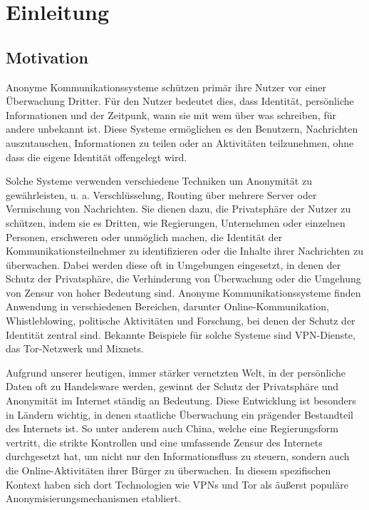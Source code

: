 \section{Einleitung}

\subsection{Motivation}

Anonyme Kommunikationssysteme schützen primär ihre Nutzer vor einer Überwachung Dritter. Für den Nutzer bedeutet dies, dass Identität, persönliche Informationen und der Zeitpunk, wann sie mit wem über was schreiben, für andere unbekannt ist. Diese Systeme ermöglichen es den Benutzern, Nachrichten auszutauschen, Informationen zu teilen oder an Aktivitäten teilzunehmen, ohne dass die eigene Identität offengelegt wird.

Solche Systeme verwenden verschiedene Techniken um Anonymität zu gewährleisten, u. a. Verschlüsselung, Routing über mehrere Server oder Vermischung von Nachrichten. Sie dienen dazu, die Privatsphäre der Nutzer zu schützen, indem sie es Dritten, wie Regierungen, Unternehmen oder einzelnen Personen, erschweren oder unmöglich machen, die Identität der Kommunikationsteilnehmer zu identifizieren oder die Inhalte ihrer Nachrichten zu überwachen.
Dabei werden diese oft in Umgebungen eingesetzt, in denen der Schutz der Privatsphäre, die Verhinderung von Überwachung oder die Umgehung von Zensur von hoher Bedeutung sind. Anonyme Kommunikationssysteme finden Anwendung in verschiedenen Bereichen, darunter Online-Kommunikation, Whistleblowing, politische Aktivitäten und Forschung, bei denen der Schutz der Identität zentral sind. Bekannte Beispiele für solche Systeme sind VPN-Dienste, das Tor-Netzwerk und Mixnets.

Aufgrund unserer heutigen, immer stärker vernetzten Welt, in der persönliche Daten oft zu Handelsware werden, gewinnt der Schutz der Privatsphäre und Anonymität im Internet ständig an Bedeutung. Diese Entwicklung ist besonders in Ländern wichtig, in denen staatliche Überwachung ein prägender Bestandteil des Internets ist.
So unter anderem auch China, welche eine Regierungsform vertritt, die strikte Kontrollen und eine umfassende Zensur des Internets durchgesetzt hat, um nicht nur den Informationsfluss zu steuern, sondern auch die Online-Aktivitäten ihrer Bürger zu überwachen. In diesem spezifischen Kontext haben sich dort Technologien wie VPNs und Tor als äußerst populäre Anonymisierungsmechanismen etabliert.

